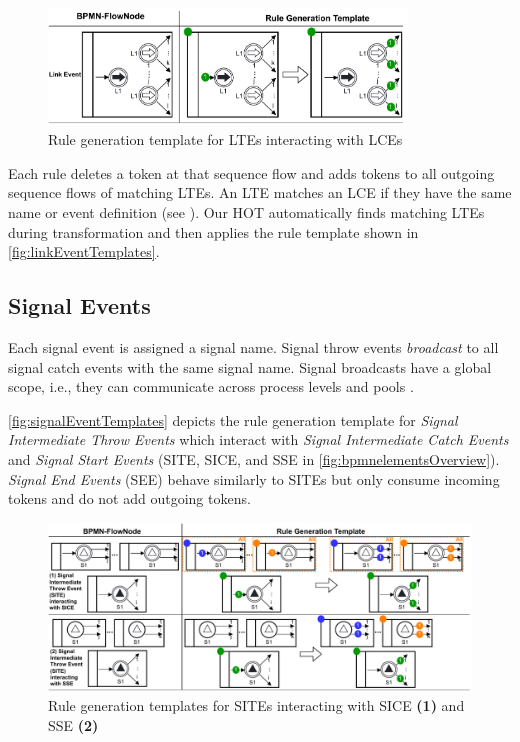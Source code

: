 \documentclass{lmcs} %
\begin{document}
\begin{figure}[ht]
    \centering
    \includegraphics[width=0.85\textwidth]{images/linkEvent_template.pdf}
    \caption{Rule generation template for LTEs interacting with LCEs}
    \label{fig:linkEventTemplates}
\end{figure}

Each rule deletes a token at that sequence flow and adds tokens to all outgoing sequence flows of matching LTEs.
An LTE matches an LCE if they have the same name or event definition (see \cite{objectmanagementgroupBusinessProcessModel2013}).
Our HOT automatically finds matching LTEs during transformation and then applies the rule template shown in \autoref{fig:linkEventTemplates}.

\subsection{Signal Events}
Each signal event is assigned a signal name.
Signal throw events \textit{broadcast} to all signal catch events with the same signal name.
Signal broadcasts have a global scope, i.e., they can communicate across process levels and pools \cite{objectmanagementgroupBusinessProcessModel2013}.

\autoref{fig:signalEventTemplates} depicts the rule generation template for \textit{Signal Intermediate Throw Events} which interact with \textit{Signal Intermediate Catch Events} and \textit{Signal Start Events} (\textsf{SITE}, \textsf{SICE}, and \textsf{SSE} in \autoref{fig:bpmnelementsOverview}).
\textit{Signal End Events} (\textsf{SEE}) behave similarly to SITEs but only consume incoming tokens and do not add outgoing tokens.

\begin{figure}[ht]
    \centering
    \includegraphics[width=1\textwidth]{images/signal_rule_template.pdf}
    \caption{Rule generation templates for SITEs interacting with SICE \textbf{(1)} and SSE \textbf{(2)}}
    \label{fig:signalEventTemplates}
\end{figure}
\end{document}
